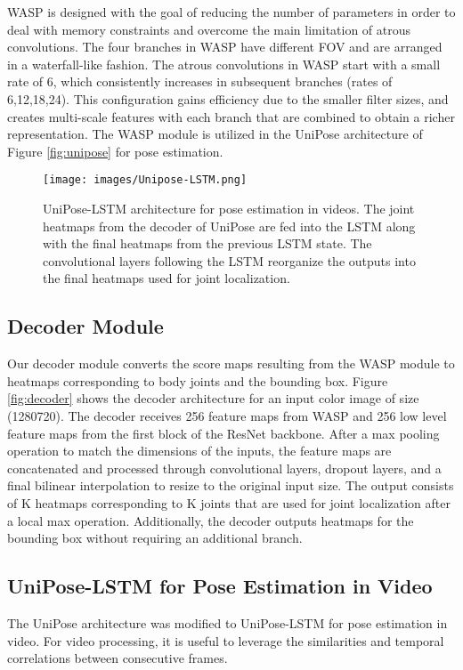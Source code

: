 \documentclass[10pt,twocolumn,letterpaper]{article}
\begin{document}
WASP is designed with the goal of reducing the number of parameters in order to deal with memory constraints and overcome the main limitation of atrous convolutions. 
The  four branches in WASP have different FOV and are arranged in a waterfall-like fashion.
The atrous convolutions in WASP start with a small rate of 6, which consistently increases in subsequent branches (rates of 6,12,18,24).  
This configuration gains efficiency due to the smaller filter sizes, and creates multi-scale features with each branch that are combined to obtain a richer representation.
The WASP module is utilized in the UniPose architecture of Figure \ref{fig:unipose} for pose estimation. 

\begin{figure*}[h]
\begin{center}
\texttt{[image: images/Unipose-LSTM.png]}
\end{center}
  \caption{UniPose-LSTM architecture for pose estimation in videos.
  The joint heatmaps from the decoder of UniPose are fed into the LSTM along with the final heatmaps from the previous LSTM state. The convolutional layers following the LSTM reorganize the outputs into the final heatmaps used for joint localization. 
  }
\label{fig:unipose-LSTM}
\end{figure*}


\subsection{Decoder Module}
Our decoder module converts the score maps resulting from the WASP module to heatmaps corresponding to body joints and the bounding box. 
Figure \ref{fig:decoder} shows the decoder architecture for an input color image of size (1280720).
The decoder receives 256 feature maps from WASP and 256 low level feature maps from the first block of the ResNet backbone. After a max pooling operation to match the dimensions of the inputs, the feature maps are concatenated and processed through convolutional layers, dropout layers, and a final bilinear interpolation to resize to the original input size.
The output consists of K heatmaps corresponding to K joints that are used for joint localization after a local max operation. Additionally, the decoder outputs heatmaps for the bounding box without requiring an additional branch.





\subsection{UniPose-LSTM for Pose Estimation in Video}
The UniPose architecture was modified to UniPose-LSTM for pose estimation in video. 
For video processing, it is useful to leverage the similarities and temporal correlations between consecutive frames.
\end{document}
